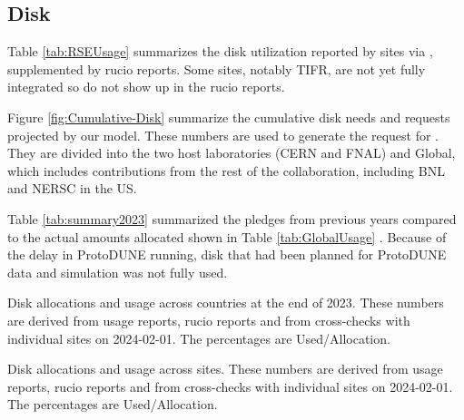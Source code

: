 \documentclass[12pt]{article}
\begin{document}
\subsection{Disk}
Table \ref{tab:RSEUsage} summarizes the disk utilization reported by sites via \cite{scotgrid}, supplemented by  rucio reports.   Some sites, notably TIFR, are not yet fully integrated so do not show up in the rucio reports.  %

Figure \ref{fig:Cumulative-Disk}  summarize the cumulative disk needs and requests projected by our model. These numbers are used to generate the request for \ThisYear.  They are divided into the two host laboratories (CERN and FNAL) and Global, which includes contributions from the rest of the collaboration, including  BNL and NERSC in the US. 

Table \ref{tab:summary2023} summarized the pledges from previous years compared to the actual amounts allocated shown in Table \ref{tab:GlobalUsage} .   Because of the delay in ProtoDUNE running, disk that had been planned for ProtoDUNE data and simulation was not fully used.  


\begin{table}[h]
\centering
{}
\caption{Disk allocations and usage across countries at the end of 2023.    These numbers are derived from usage reports,  rucio reports and from cross-checks with individual sites on 2024-02-01.  The percentages are Used/Allocation. }
\label{tab:GlobalUsage}
\end{table}

\begin{table}
\centering
{}
\caption{Disk allocations and usage across sites.    These numbers are derived from usage reports,  rucio reports and from cross-checks with individual sites on 2024-02-01.  The percentages are Used/Allocation. }
\label{tab:RSEUsage}
\end{table}
\end{document}
